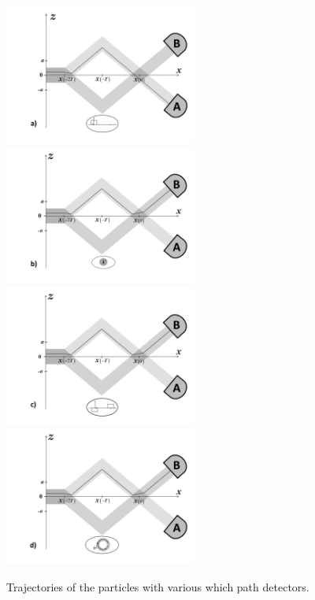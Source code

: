 \documentclass[preprint,tightenlines]{elsarticle}
\begin{document}
\begin{figure}[H]
   \vspace{-20pt}
   \includegraphics[width=6.3cm]{7a.pdf}\\
  \vspace{-10pt}
   \includegraphics[width=6.3cm]{7b.pdf}\\ \vspace{-8pt}
     \includegraphics[width=6.3cm]{7c.pdf}\\ \vspace{-8pt}
     \includegraphics[width=6.3cm]{7d.pdf}\\ \vspace{-15pt}
    \caption{Trajectories of the particles with various which path detectors.
}
\end{figure}
\end{document}
